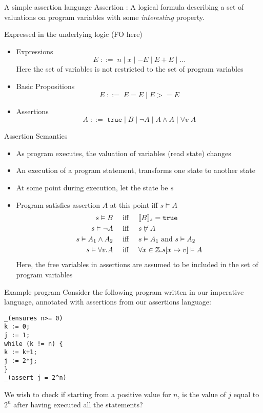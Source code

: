 \documentclass[presentation]{beamer}
\begin{document}
\begin{frame}[label={sec:org3b6cb7f}]{A simple assertion language}
\alert{Assertion} : A logical formula describing a set of valuations on program variables with some
\emph{interesting} property.

Expressed in the underlying logic (FO here)

\begin{itemize}
\item Expressions
\begin{equation*}
E\;::=\;n\mid x\mid -E\mid E+E\mid\dots
\end{equation*}
Here the set of variables is not restricted to the set of program variables
\item Basic Propositions
\begin{equation*}
E\;::=\; E=E\mid E>= E
\end{equation*}
\item Assertions
\begin{equation*}
A\;::=\;\texttt{true}\mid B\mid\neg A\mid A\wedge A\mid\forall v\;A
\end{equation*}
\end{itemize}
\end{frame}
\begin{frame}[label={sec:org8866bd9}]{Assertion Semantics}
\begin{itemize}
\item As program executes, the valuation of variables (read \alert{state}) changes
\item An execution of a program statement, transforms one state to another state
\item At some point during execution, let the state be \(s\)
\item Program satisfies assertion \(A\) at this point iff \(s\vDash A\)
\begin{align*}
s\vDash B&\quad\text{ iff }\quad\llbracket B \rrbracket_s=\texttt{true}\\
s\vDash\neg A&\quad\text{ iff }\quad s\not\vDash A\\
s\vDash A_1\wedge A_2&\quad\text{ iff }\quad s\vDash A_1\text{ and }s\vDash A_2\\
s\vDash\forall v.A&\quad\text{ iff }\quad \forall x\in\mathbb{Z}.s[x\mapsto v]\vDash A
\end{align*}
Here, the free variables in assertions are assumed to be included in the set of program variables
\end{itemize}
\end{frame}
\begin{frame}[label={sec:org2a73851},fragile]{Example program}
 Consider the following program written in our imperative language, annotated with assertions
from our assertions language:
\begin{verbatim}
_(ensures n>= 0)
k := 0;
j := 1;
while (k != n) {
k := k+1;
j := 2*j;
}
_(assert j = 2^n)
\end{verbatim}

We wish to check if starting from a positive value for \(n\), is the value of \(j\) equal
to \(2^n\) after having executed all the statements?
\end{frame}
\end{document}
